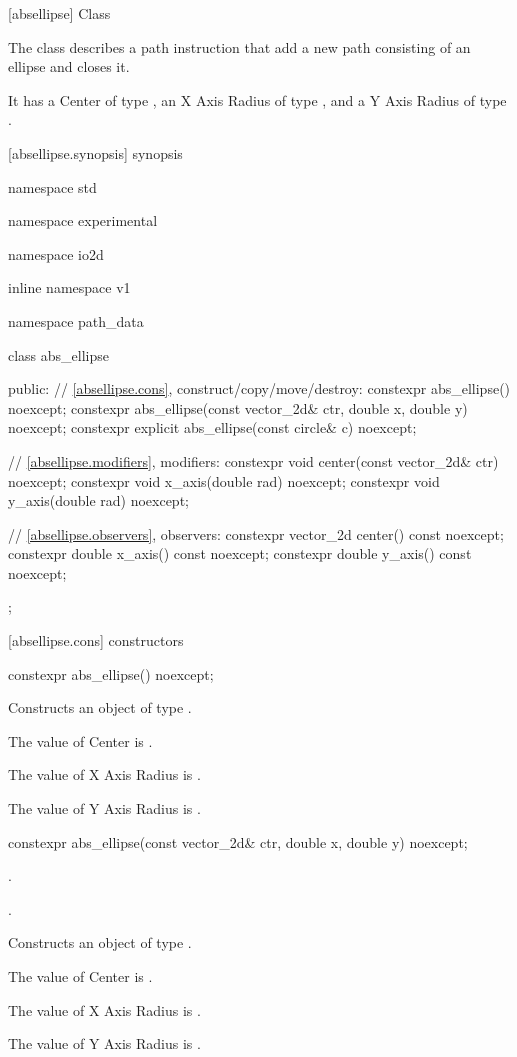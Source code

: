  [absellipse] {Class }

\pnum
{}
The class  describes a path instruction that add a new path consisting of an ellipse and closes it.

\pnum
It has a Center of type , an X Axis Radius of type , and a Y Axis Radius of type .

 [absellipse.synopsis] { synopsis}

\begin{codeblock}
namespace std { namespace experimental { namespace io2d { inline namespace v1 {
  namespace path_data {
    class abs_ellipse {
    public:
      // \ref{absellipse.cons}, construct/copy/move/destroy:
      constexpr abs_ellipse() noexcept;
      constexpr abs_ellipse(const vector_2d& ctr, double x, double y) noexcept;
      constexpr explicit abs_ellipse(const circle& c) noexcept;

      // \ref{absellipse.modifiers}, modifiers:
      constexpr void center(const vector_2d& ctr) noexcept;
      constexpr void x_axis(double rad) noexcept;
      constexpr void y_axis(double rad) noexcept;
    
      // \ref{absellipse.observers}, observers:
      constexpr vector_2d center() const noexcept;
      constexpr double x_axis() const noexcept;
      constexpr double y_axis() const noexcept;
    };
  }
} } } }
\end{codeblock}

 [absellipse.cons] { constructors}

\begin{itemdecl}
constexpr abs_ellipse() noexcept;
\end{itemdecl}
\begin{itemdescr}
\pnum
\effects
Constructs an object of type .

\pnum
The value of Center is .

\pnum
The value of X Axis Radius is .

\pnum
The value of Y Axis Radius is .
\end{itemdescr}

\begin{itemdecl}
constexpr abs_ellipse(const vector_2d& ctr, double x, double y) noexcept;
\end{itemdecl}
\begin{itemdescr}
\pnum
\requires
{}.

\pnum
{}.

\pnum
\effects
Constructs an object of type .

\pnum
The value of Center is .

\pnum
The value of X Axis Radius is .

\pnum
The value of Y Axis Radius is .
\end{itemdescr}

